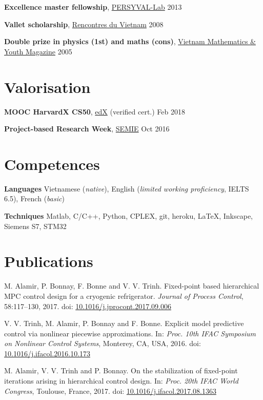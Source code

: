 \documentclass[a4paper,11pt]{article}
\begin{document}
\textbf{Excellence master fellowship}, 
\href{http://persyval-lab.org/}{PERSYVAL-Lab}
\hfill {2013}

\vspace{0.1cm}

\textbf{Vallet scholarship}, 
\href{http://vietnam.in2p3.fr/}{Rencontres du Vietnam}
\hfill {2008}

\vspace{0.1cm}

\textbf{Double prize in physics (1st) and maths (cons)}, 
\href{http://www.nxbgd.vn/toanhoctuoitre}{Vietnam Mathematics \& Youth Magazine}
\hfill {2005}

\section{Valorisation}

\textbf{MOOC HarvardX CS50}, 
\href{https://www.edx.org}{edX} (verified cert.)
\hfill {Feb 2018}

\vspace{0.1cm}

\textbf{Project-based Research Week}, 
\href{http://semie.imag.fr/}{SEMIE}
\hfill {Oct 2016}

\section{Competences}

\textbf{Languages }
Vietnamese (\emph{native}), English (\emph{limited working proficiency}, IELTS 6.5), French (\emph{basic})

\vspace{0.1cm}

\textbf{Techniques }
Matlab, C/C++, Python, CPLEX, git, heroku, \LaTeX, Inkscape, Siemens S7, STM32

\section{Publications}

\begin{bibenum}

\item M. Alamir, P. Bonnay, F. Bonne and V. V. Trinh.
Fixed-point based hierarchical MPC control design for a cryogenic refrigerator. 
\emph{Journal of Process Control}, 58:117--130, 2017.
doi: \url{10.1016/j.jprocont.2017.09.006}

\item V. V. Trinh, M. Alamir, P. Bonnay and F. Bonne. 
Explicit model predictive control via nonlinear piecewise approximations.
In: \emph{Proc. 10th IFAC Symposium on Nonlinear Control Systems}, Monterey, CA, USA, 2016.
doi: \url{10.1016/j.ifacol.2016.10.173}

\item M. Alamir, V. V. Trinh and P. Bonnay. 
On the stabilization of fixed-point iterations arising in hierarchical control design.
In: \emph{Proc. 20th IFAC World Congress}, Toulouse, France, 2017.
doi: \url{10.1016/j.ifacol.2017.08.1363}

\end{bibenum}

\end{document}
